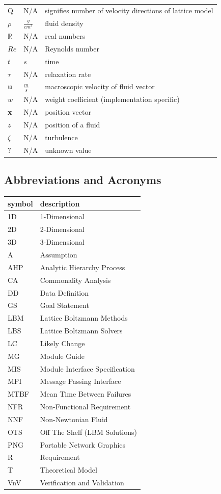 \documentclass[12pt]{article}
\begin{document}
\begin{longtable*}{l l p{12cm}}
$\mathrm{Q}$ & N/A & signifies number of velocity directions of lattice model
\\
$\rho$ & $\frac{g}{cm^3}$ & fluid density
\\
$\mathbb{R}$ & N/A & real numbers
\\
$Re$ & N/A & Reynolds number
\\
$t$ & $s$ & time
\\
$\tau$ & N/A & relaxation rate
\\
\textbf{u} & $\frac{m}{s}$ & macroscopic velocity of fluid vector
\\
$w$ & N/A & weight coefficient (implementation specific)
\\
\textbf{x} & N/A & position vector
\\
$z$ & N/A & position of a fluid
\\
$\zeta$ & N/A & turbulence
\\
$?$ & N/A & unknown value 
\\
\bottomrule
\end{longtable*}

\subsection{Abbreviations and Acronyms}

\renewcommand{\arraystretch}{1.2}
\begin{tabular}{l l} 
  \toprule		
  \textbf{symbol} & \textbf{description}\\
  \midrule
  1D & 1-Dimensional\\ 
  2D & 2-Dimensional\\ 
  3D & 3-Dimensional\\ 
  A & Assumption\\
  AHP & Analytic Hierarchy Process\\
  CA & Commonality Analysis\\
  DD & Data Definition\\
  GS & Goal Statement\\
  LBM & Lattice Boltzmann Methods\\
  LBS & Lattice Boltzmann Solvers\\
  LC & Likely Change\\
  MG & Module Guide\\
  MIS & Module Interface Specification\\
  MPI & Message Passing Interface\\
  MTBF & Mean Time Between Failures\\
  NFR & Non-Functional Requirement\\
  NNF & Non-Newtonian Fluid\\
  OTS & Off The Shelf (LBM Solutions)\\
  PNG & Portable Network Graphics\\
  R & Requirement\\
  T & Theoretical Model\\
  VnV & Verification and Validation\\
  \bottomrule
\end{tabular}\\
\end{document}
